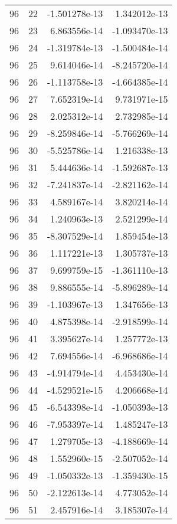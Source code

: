 \begin{tabular}{rrrr}
  96 &   22 & -1.501278e-13 &  1.342012e-13 \\
  96 &   23 &  6.863556e-14 & -1.093470e-13 \\
  96 &   24 & -1.319784e-13 & -1.500484e-14 \\
  96 &   25 &  9.614046e-14 & -8.245720e-14 \\
  96 &   26 & -1.113758e-13 & -4.664385e-14 \\
  96 &   27 &  7.652319e-14 &  9.731971e-15 \\
  96 &   28 &  2.025312e-14 &  2.732985e-14 \\
  96 &   29 & -8.259846e-14 & -5.766269e-14 \\
  96 &   30 & -5.525786e-14 &  1.216338e-13 \\
  96 &   31 &  5.444636e-14 & -1.592687e-13 \\
  96 &   32 & -7.241837e-14 & -2.821162e-14 \\
  96 &   33 &  4.589167e-14 &  3.820214e-14 \\
  96 &   34 &  1.240963e-13 &  2.521299e-14 \\
  96 &   35 & -8.307529e-14 &  1.859454e-13 \\
  96 &   36 &  1.117221e-13 &  1.305737e-13 \\
  96 &   37 &  9.699759e-15 & -1.361110e-13 \\
  96 &   38 &  9.886555e-14 & -5.896289e-14 \\
  96 &   39 & -1.103967e-13 &  1.347656e-13 \\
  96 &   40 &  4.875398e-14 & -2.918599e-14 \\
  96 &   41 &  3.395627e-14 &  1.257772e-13 \\
  96 &   42 &  7.694556e-14 & -6.968686e-14 \\
  96 &   43 & -4.914794e-14 &  4.453430e-14 \\
  96 &   44 & -4.529521e-15 &  4.206668e-14 \\
  96 &   45 & -6.543398e-14 & -1.050393e-13 \\
  96 &   46 & -7.953397e-14 &  1.485247e-13 \\
  96 &   47 &  1.279705e-13 & -4.188669e-14 \\
  96 &   48 &  1.552960e-15 & -2.507052e-14 \\
  96 &   49 & -1.050332e-13 & -1.359430e-15 \\
  96 &   50 & -2.122613e-14 &  4.773052e-14 \\
  96 &   51 &  2.457916e-14 &  3.185307e-14 \\

\end{tabular}
